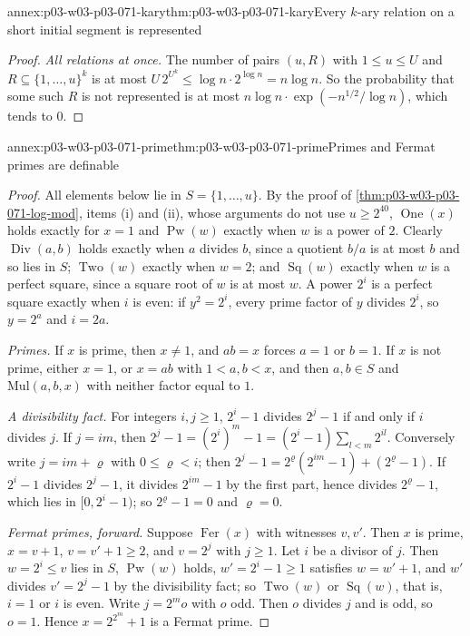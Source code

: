 \begin{annexitem}{annex:p03-w03-p03-071-kary}{thm:p03-w03-p03-071-kary}{Every \(k\)-ary relation on a short initial segment is represented}
\begin{proof}
\emph{All relations at once.}  The number of pairs \((u,R)\) with
\(1\leq u\leq U\) and \(R\subseteq\{1,\ldots,u\}^k\) is at most
\(U\,2^{U^k}\leq\log n\cdot2^{\log n}=n\log n\).  So the probability that
some such \(R\) is not represented is at most
\(n\log n\cdot\exp(-n^{1/2}/\log n)\), which tends to \(0\).
\end{proof}
\end{annexitem}

\begin{annexitem}{annex:p03-w03-p03-071-prime}{thm:p03-w03-p03-071-prime}{Primes and Fermat primes are definable}
\begin{proof}
All elements below lie in \(S=\{1,\ldots,u\}\).  By the proof of
\cref{thm:p03-w03-p03-071-log-mod}, items (i) and (ii), whose arguments do
not use \(u\geq2^{40}\), \(\operatorname{One}(x)\) holds exactly for \(x=1\)
and \(\operatorname{Pw}(w)\) exactly when \(w\) is a power of \(2\).
Clearly \(\operatorname{Div}(a,b)\) holds exactly when \(a\) divides \(b\),
since a quotient \(b/a\) is at most \(b\) and so lies in \(S\);
\(\operatorname{Two}(w)\) exactly when \(w=2\); and \(\operatorname{Sq}(w)\)
exactly when \(w\) is a perfect square, since a square root of \(w\) is at
most \(w\).  A power \(2^i\) is a perfect square exactly when \(i\) is even:
if \(y^2=2^i\), every prime factor of \(y\) divides \(2^i\), so \(y=2^a\) and
\(i=2a\).

\emph{Primes.}  If \(x\) is prime, then \(x\neq1\), and \(ab=x\) forces
\(a=1\) or \(b=1\).  If \(x\) is not prime, either \(x=1\), or \(x=ab\) with
\(1<a,b<x\), and then \(a,b\in S\) and \(\mathrm{Mul}(a,b,x)\) with neither
factor equal to \(1\).

\emph{A divisibility fact.}  For integers \(i,j\geq1\), \(2^i-1\) divides
\(2^j-1\) if and only if \(i\) divides \(j\).  If \(j=im\), then
\(2^j-1=(2^i)^m-1=(2^i-1)\sum_{l<m}2^{il}\).  Conversely write \(j=im+\varrho\)
with \(0\leq\varrho<i\); then
\(2^j-1=2^\varrho(2^{im}-1)+(2^\varrho-1)\).  If \(2^i-1\) divides
\(2^j-1\), it divides \(2^{im}-1\) by the first part, hence divides
\(2^\varrho-1\), which lies in \([0,2^i-1)\); so \(2^\varrho-1=0\) and
\(\varrho=0\).

\emph{Fermat primes, forward.}  Suppose \(\operatorname{Fer}(x)\) with
witnesses \(v,v'\).  Then \(x\) is prime, \(x=v+1\), \(v=v'+1\geq2\), and
\(v=2^j\) with \(j\geq1\).  Let \(i\) be a divisor of \(j\).  Then
\(w=2^i\leq v\) lies in \(S\), \(\operatorname{Pw}(w)\) holds,
\(w'=2^i-1\geq1\) satisfies \(w=w'+1\), and \(w'\) divides \(v'=2^j-1\) by
the divisibility fact; so \(\operatorname{Two}(w)\) or
\(\operatorname{Sq}(w)\), that is, \(i=1\) or \(i\) is even.  Write
\(j=2^mo\) with \(o\) odd.  Then \(o\) divides \(j\) and is odd, so \(o=1\).
Hence \(x=2^{2^m}+1\) is a Fermat prime.


\end{proof}
\end{annexitem}
